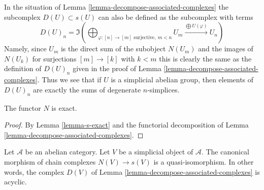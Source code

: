 \begin{remark}
\label{remark-degenerate-subcomplex}
In the situation of Lemma \ref{lemma-decompose-associated-complexes}
the subcomplex $D(U) \subset s(U)$ can also be defined as the
subcomplex with terms
$$
D(U)_n = \Im\left(
\bigoplus\nolimits_{\varphi : [n] \to [m]\text{ surjective}, \ m < n} U_m
\xrightarrow{\bigoplus U(\varphi)}
U_n\right)
$$
Namely, since $U_m$ is the direct sum of the subobject $N(U_m)$
and the images of $N(U_k)$ for surjections $[m] \to [k]$ with $k < m$
this is clearly the same as the definition of $D(U)_n$ given in
the proof of Lemma \ref{lemma-decompose-associated-complexes}.
Thus we see that if $U$ is a simplicial abelian group, then
elements of $D(U)_n$ are exactly the sums of degenerate $n$-simplices.
\end{remark}

\begin{lemma}
\label{lemma-N-exact}
The functor $N$ is exact.
\end{lemma}

\begin{proof}
By Lemma \ref{lemma-s-exact} and the functorial
decomposition of Lemma \ref{lemma-decompose-associated-complexes}.
\end{proof}

\begin{lemma}
\label{lemma-quasi-isomorphism}
Let $\mathcal{A}$ be an abelian category.
Let $V$ be a simplicial object of $\mathcal{A}$.
The canonical morphism of chain complexes
$N(V) \to s(V)$ is a quasi-isomorphism.
In other words, the complex $D(V)$ of Lemma
\ref{lemma-decompose-associated-complexes} is acyclic.
\end{lemma}

